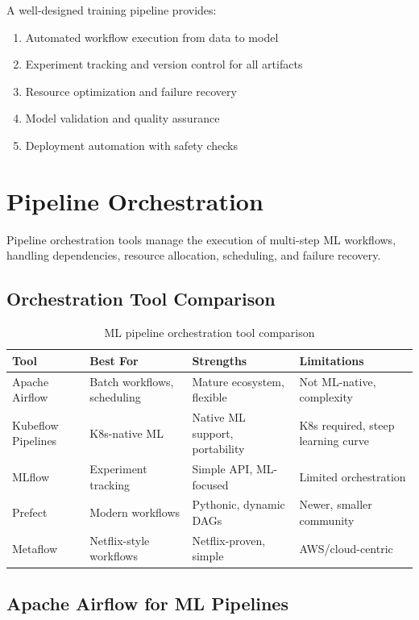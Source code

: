 A well-designed training pipeline provides:
\begin{enumerate}
    \item Automated workflow execution from data to model
    \item Experiment tracking and version control for all artifacts
    \item Resource optimization and failure recovery
    \item Model validation and quality assurance
    \item Deployment automation with safety checks
\end{enumerate}

\section{Pipeline Orchestration}

Pipeline orchestration tools manage the execution of multi-step ML workflows, handling dependencies, resource allocation, scheduling, and failure recovery.

\subsection{Orchestration Tool Comparison}

\begin{table}[h]
\centering
\begin{tabular}{|l|p{3cm}|p{3cm}|p{3cm}|}
\hline
\textbf{Tool} & \textbf{Best For} & \textbf{Strengths} & \textbf{Limitations} \\
\hline
Apache Airflow & Batch workflows, scheduling & Mature ecosystem, flexible & Not ML-native, complexity \\
\hline
Kubeflow Pipelines & K8s-native ML & Native ML support, portability & K8s required, steep learning curve \\
\hline
MLflow & Experiment tracking & Simple API, ML-focused & Limited orchestration \\
\hline
Prefect & Modern workflows & Pythonic, dynamic DAGs & Newer, smaller community \\
\hline
Metaflow & Netflix-style workflows & Netflix-proven, simple & AWS/cloud-centric \\
\hline
\end{tabular}
\caption{ML pipeline orchestration tool comparison}
\label{tab:orchestration_tools}
\end{table}

\subsection{Apache Airflow for ML Pipelines}

